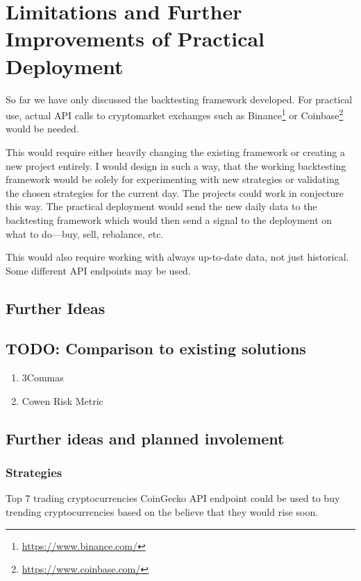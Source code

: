 \chapter{Limitations and Further Improvements of Practical Deployment}
\label{chapter-limitations-and-improvements}

So far we have only discussed the backtesting framework developed. For practical use, actual API calls to cryptomarket exchanges such as Binance\footnote{\url{https://www.binance.com/}} or Coinbase\footnote{\url{https://www.coinbase.com/}} would be needed.

This would require either heavily changing the existing framework or creating a new project entirely. I would design in such a way, that the working backtesting framework would be solely for experimenting with new strategies or validating the chosen strategies for the current day. The projects could work in conjecture this way. The practical deployment would send the new daily data to the backtesting framework which would then send a signal to the deployment on what to do---buy, sell, rebalance, etc.

This would also require working with always up-to-date data, not just historical. Some different API endpoints may be used.

\section{Further Ideas}

\section{TODO: Comparison to existing solutions}
\begin{enumerate}
    \item 3Commas
    \item Cowen Risk Metric
\end{enumerate}

\section{Further ideas and planned involement}
\subsection*{Strategies}
Top 7 trading cryptocurrencies CoinGecko API endpoint could be used to buy trending cryptocurrencies based on the believe that they would rise soon.

